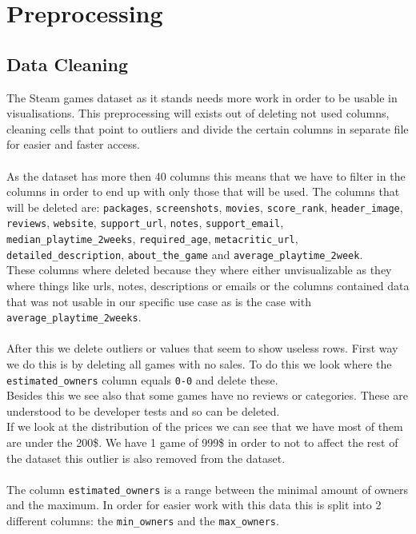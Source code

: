 \documentclass{article}
\begin{document}
	\newpage
	
	\section{Preprocessing}
	
	\subsection{Data Cleaning}
	
	The Steam games dataset as it stands needs more work in order to be usable in visualisations. This preprocessing will exists out of deleting not used columns, cleaning cells that point to outliers and divide the certain columns in separate file for easier and faster access.\\
	\\
	As the dataset has more then 40 columns this means that we have to filter in the columns in order to end up with only those that will be used. The columns that will be deleted are: \texttt{packages}, \texttt{screenshots}, \texttt{movies}, \texttt{score\_rank}, \texttt{header\_image}, \texttt{reviews}, \texttt{website}, \texttt{support\_url}, \texttt{notes}, \texttt{support\_email}, \texttt{median\_playtime\_2weeks}, \texttt{required\_age}, \texttt{metacritic\_url}, \texttt{detailed\_description}, \texttt{about\_the\_game} and \texttt{average\_playtime\_2week}.\\
	These columns where deleted because they where either unvisualizable as they where things like urls, notes, descriptions or emails or the columns contained data that was not usable in our specific use case as is the case with \texttt{average\_playtime\_2weeks}.\\
	\\
	After this we delete outliers or values that seem to show useless rows. First way we do this is by deleting all games with no sales. To do this we look where the \texttt{estimated\_owners} column equals \texttt{0-0} and delete these.\\
	Besides this we see also that some games have no reviews or categories. These are understood to be developer tests and so can be deleted.\\
	If we look at the distribution of the prices we can see that we have most of them are under the 200\$. We have 1 game of 999\$ in order to not to affect the rest of the dataset this outlier is also removed from the dataset.\\
	\\
	The column \texttt{estimated\_owners} is a range between the minimal amount of owners and the maximum. In order for easier work with this data this is split into 2 different columns: the \texttt{min\_owners} and the \texttt{max\_owners}.\\
\end{document}
